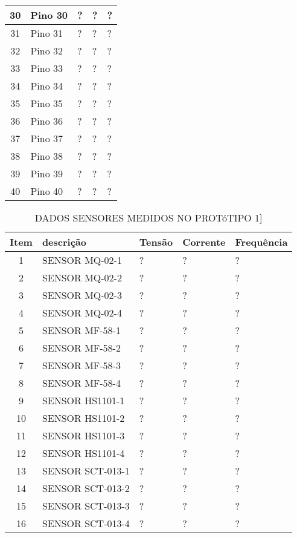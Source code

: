 \begin{table}
\begin{tabular}{ |c | p{3cm}| p{3cm} |p{3cm} | p{3cm} | }
		30 & Pino 30 & ? & ? & ? \\ \hline
		31 & Pino 31 & ? & ? & ? \\ \hline
		32 & Pino 32 & ? & ? & ? \\ \hline
		33 & Pino 33 & ? & ? & ? \\ \hline
		34 & Pino 34 & ? & ? & ? \\ \hline
		35 & Pino 35 & ? & ? & ? \\ \hline
		36 & Pino 36 & ? & ? & ? \\ \hline
		37 & Pino 37 & ? & ? & ? \\ \hline
		38 & Pino 38 & ? & ? & ? \\ \hline
		39 & Pino 39 & ? & ? & ? \\ \hline		
		40 & Pino 40 & ? & ? & ?\\ \hline
		
	\end{tabular}					
	
\end{table}

\begin{table}
	\centering
	\caption{DADOS SENSORES MEDIDOS NO PROTóTIPO 1]}
	\begin{tabular}{ |c | p{3cm}| p{3cm} |p{3cm} | p{3cm} | } \hline
		\textbf{ Item} 	   & \textbf{descrição}	&\textbf{Tensão} &\textbf{Corrente} &\textbf{Frequência} \\ \hline
		1  & SENSOR MQ-02-1 & ? & ? & ? \\ \hline
		2  & SENSOR MQ-02-2 & ? & ? & ? \\ \hline
		3  & SENSOR MQ-02-3 & ? & ? & ? \\ \hline
		4  & SENSOR MQ-02-4 & ? & ? & ? \\ \hline
		5  & SENSOR MF-58-1 & ? & ? & ?\\ \hline
		6  & SENSOR MF-58-2 & ? & ? & ?\\ \hline
		7  & SENSOR MF-58-3 & ? & ? & ?\\ \hline
		8  & SENSOR MF-58-4 & ? & ? & ?\\ \hline
		9  & SENSOR HS1101-1 & ? & ? & ?\\ \hline
		10  & SENSOR HS1101-2 & ? & ? & ?\\ \hline
		11 & SENSOR HS1101-3 & ? & ? & ?\\ \hline
		12 & SENSOR HS1101-4 & ? & ? & ?\\ \hline
		13 & SENSOR SCT-013-1& ? & ? & ?\\ \hline
		14 & SENSOR SCT-013-2& ? & ? & ?\\ \hline
		15 & SENSOR SCT-013-3& ? & ? & ?\\ \hline
		16 & SENSOR SCT-013-4& ? & ? & ?\\ \hline
		
		
	\end{tabular}					
	
	
	\label{T15}\par
\end{table}


